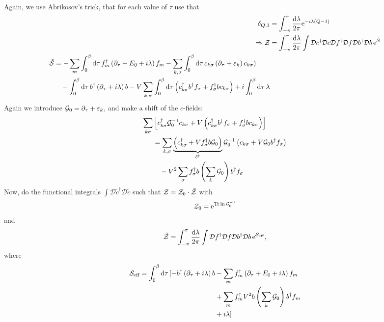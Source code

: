 Again, we use Abrikosov's trick, that for each value of $\tau$ use that
\begin{align}
	\delta_{Q,1} &= \int_{-\pi}^\pi \frac{\dd{\lambda}}{2\pi}\mathrm{e}^{-i\lambda(Q-1)} \\
	\Rightarrow \mathcal{Z} &= \int_{-\pi}^\pi \frac{\dd{\lambda}}{2\pi}\int\mathcal{D}c^\dagger\mathcal{D}c\mathcal{D}f^\dagger\mathcal{D}f\mathcal{D}b^\dagger\mathcal{D}b\,\mathrm{e}^{\tilde{\mathcal{S}}} \\
	\begin{split}
		\tilde{\mathcal{S}} &= -\sum_m\int_0^\beta \dd{\tau} f_m^\dagger\left(\partial_\tau + E_0 + i\lambda\right)f_m - \sum_{k,\sigma}\int_0^\beta \dd{\tau} c_{k\sigma}\left(\partial_\tau + \varepsilon_k\right) c_{k\sigma}) \\
		&\quad -\int_0^\beta \dd{\tau}b^\dagger\left(\partial_\tau + i\lambda\right) b - V\sum_{k, \sigma}\int_0^\beta \dd{\tau}\left(c_{k\sigma}^\dagger b^\dagger f_\sigma + f_\sigma^\dagger b c_{k\sigma}\right) + i\int_{0}^\beta\dd{\tau}\lambda  
	\end{split}
\end{align}
Again we introduce $\mathcal{G}_0 = \partial_\tau + \varepsilon_k$, and make a shift of the $c$-fields:
\begin{align*}
	\sum_{k\sigma}&\left[c_{k\sigma}^\dagger \mathcal{G}_0^{-1}c_{k\sigma} + V\left(c_{k\sigma}^\dagger b^\dagger f_\sigma + f_\sigma^\dagger bc_{k\sigma}\right)\right]\\
	&=\sum_{k,\sigma}\underbrace{\left(c_{k\sigma}^\dagger + Vf_{\sigma}^\dagger b\mathcal{G}_0\right)}_{\tilde{c}^\dagger}\mathcal{G}_0^{-1}\left(c_{k\sigma} + V\mathcal{G}_0 b^\dagger f_\sigma\right) \\
	&\quad - V^2\sum_\sigma f_\sigma^\dagger b\left(\sum_k\mathcal{G}_0\right)b^\dagger f_\sigma
\end{align*}
Now, do the functional integrals $\int\mathcal{D}\tilde{c}^\dagger\mathcal{D}\tilde{c}$ such that $\mathcal{Z} = \mathcal{Z}_0\cdot\tilde{\mathcal{Z}}$ with 
\begin{equation*}
\mathcal{Z}_0 = \mathrm{e}^{\Tr\ln\mathcal{G}_0^{-1}}
\end{equation*}
and
\begin{equation*}
	\tilde{\mathcal{Z}} = \int_{-\pi}^\pi \frac{\dd{\lambda}}{2\pi}\int\mathcal{D}f^\dagger\mathcal{D}f\mathcal{D}b^\dagger\mathcal{D}b\,\mathrm{e}^{\mathcal{S}_{\text{eff}}},
\end{equation*}
where 
\begin{align*}
\mathcal{S}_{\text{eff}} = \int_0^\beta\dd{\tau}[-b^\dagger\left(\partial_\tau + i\lambda\right)b &- \sum_m f_m^\dagger\left(\partial_\tau + E_0 + i\lambda\right)f_m\\
&+ \sum_m f_m^\dagger V^2 b\left(\sum_k\mathcal{G}_0\right)b^\dagger f_m \\
&+i\lambda]
\end{align*}
